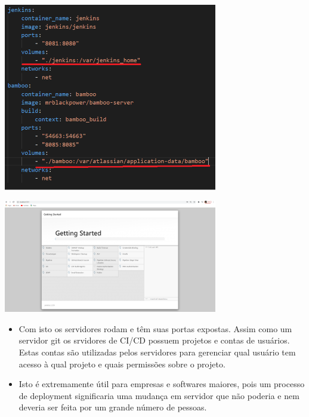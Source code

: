 \documentclass[10pt]{beamer}
\theoremstyle{remark}
\theoremstyle{definition}
\begin{document}
\begin{frame}[allowframebreaks]
\begin{itemize}
	\end{itemize}
	
	\begin{center}
		\includegraphics[width=0.7\textwidth]{images/41.png}
	\end{center}
	
	\framebreak
	
	\begin{center}
		\includegraphics[width=0.7\textwidth]{images/42.png}
	\end{center}
	
	\framebreak
	
	\begin{itemize}
	
		\item Com isto os servidores rodam e têm suas portas expostas. Assim como um servidor git os srvidores de CI/CD possuem projetos e contas de usuários. Estas contas são utilizadas pelos servidores para gerenciar qual usuário tem acesso à qual projeto e quais permissões sobre o projeto.
		
		\item Isto é extremamente útil para empresas e softwares maiores, pois um processo de deployment significaria uma mudança em servidor que não poderia e nem deveria ser feita por um grande número de pessoas.
		
	\end{itemize}
	
\end{frame}
\end{document}

